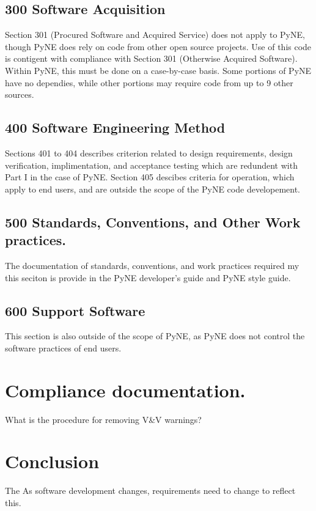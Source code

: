 \documentclass{anstrans}
\begin{document}
\subsection{300 Software Acquisition}

Section 301 (Procured Software and Acquired Service) does not apply to PyNE,
though PyNE does rely on code from other open source projects. Use of this code
is contigent with compliance with Section 301 (Otherwise Acquired Software).
Within PyNE, this must be done on a case-by-case basis. Some portions of PyNE
have no dependies, while other portions may require code from up to 9 other
sources. 



\subsection{400 Software Engineering Method}

Sections 401 to 404 describes criterion related to design requirements, design
verification, implimentation, and acceptance testing which are redundent with
Part I in the case of PyNE. Section 405 descibes criteria for operation, which
apply to end users, and are outside the scope of the PyNE code developement.


\subsection{500 Standards, Conventions, and Other Work practices.}

The documentation of standards, conventions, and work practices required my
this seciton is provide in the PyNE developer's guide and PyNE style guide.

\subsection{600 Support Software}
This section is also outside of the scope of PyNE, as PyNE does not control the software practices of end users.


\section{Compliance documentation.}
What is the procedure for removing V\&V warnings?


\section{Conclusion}

The 
As software development changes, requirements need to change to reflect this.



\end{document}
